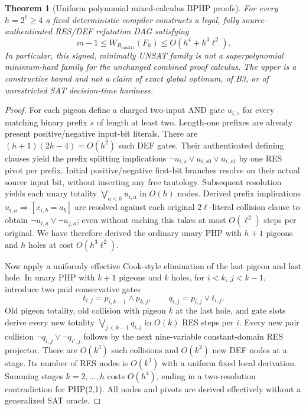 \documentclass[11pt]{article}
\newtheorem{theorem}{Theorem}
\begin{document}
\begin{theorem}[Uniform polynomial mixed-calculus BPHP proofs]
For every $h=2^\ell\ge4$ a fixed deterministic compiler constructs a legal, fully source-authenticated RES/DEF refutation DAG satisfying
\[
\boxed{m-1\le W_{R_{\mathrm{mix341}}}(F_h)\le O(h^4+h^3\ell^2).}
\]
In particular, this signed, minimally UNSAT family is \emph{not} a superpolynomial minimum-hard family for the unchanged combined proof calculus. The upper is a constructive bound and not a claim of exact global optimum, of B3, or of unrestricted SAT decision-time hardness.
\end{theorem}
\begin{proof}
For each pigeon define a charged two-input AND gate $u_{i,s}$ for every matching binary prefix $s$ of length at least two. Length-one prefixes are already present positive/negative input-bit literals. There are $(h+1)(2h-4)=O(h^2)$ such DEF gates. Their authenticated defining clauses yield the prefix splitting implications $\neg u_{i,s}\vee u_{i,s0}\vee u_{i,s1}$ by one RES pivot per prefix. Initial positive/negative first-bit branches resolve on their actual source input bit, without inserting any free tautology. Subsequent resolution yields each unary totality $\bigvee_{a<h}u_{i,a}$ in $O(h)$ nodes. Derived prefix implications $u_{i,a}\Rightarrow[x_{i,b}=a_b]$ are resolved against each original $2\ell$-literal collision clause to obtain $\neg u_{i,a}\vee\neg u_{j,a}$; even without caching this takes at most $O(\ell^2)$ steps per original. We have therefore derived the ordinary unary PHP with $h+1$ pigeons and $h$ holes at cost $O(h^3\ell^2)$.

Now apply a uniformly effective Cook-style elimination of the last pigeon and last hole. In unary PHP with $k+1$ pigeons and $k$ holes, for $i<k$, $j<k-1$, introduce two paid conservative gates
\[
t_{i,j}=p_{i,k-1}\land p_{k,j},\qquad
q_{i,j}=p_{i,j}\lor t_{i,j}.
\]
Old pigeon totality, old collision with pigeon $k$ at the last hole, and gate slots derive every new totality $\bigvee_{j<k-1}q_{i,j}$ in $O(k)$ RES steps per $i$. Every new pair collision $\neg q_{i,j}\vee\neg q_{i',j}$ follows by the next nine-variable constant-domain RES projector. There are $O(k^3)$ such collisions and $O(k^2)$ new DEF nodes at a stage. Its number of RES nodes is $O(k^3)$ with a uniform fixed local derivation. Summing stages $k=2,\ldots,h$ costs $O(h^4)$, ending in a two-resolution contradiction for PHP(2,1). All nodes and pivots are derived effectively without a generalized SAT oracle. \end{proof}
\end{document}
